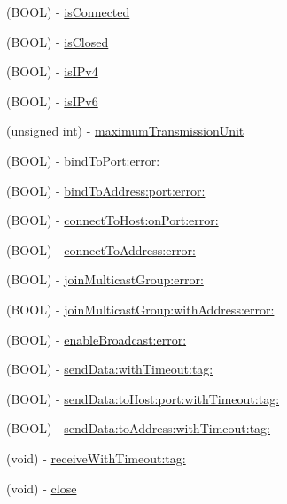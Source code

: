 \begin{DoxyCompactItemize}
\item 
(BOOL) -\/ \hyperlink{interface_async_udp_socket_ad3515f7fe2b8ed2b9e14233cf7ede0bc}{isConnected}
\item 
(BOOL) -\/ \hyperlink{interface_async_udp_socket_a96bdc12808ebe75b38f64381cedbf9df}{isClosed}
\item 
(BOOL) -\/ \hyperlink{interface_async_udp_socket_a7f1734034c9aa5b62cfeb69f203729e3}{isIPv4}
\item 
(BOOL) -\/ \hyperlink{interface_async_udp_socket_aa009ac699bce64f1d087a0eafeb2a371}{isIPv6}
\item 
(unsigned int) -\/ \hyperlink{interface_async_udp_socket_ab7dadd88df12ecfbd833b9db58c1b0a9}{maximumTransmissionUnit}
\item 
(BOOL) -\/ \hyperlink{interface_async_udp_socket_aecbce637b4fb5f214a710119d9d6a67b}{bindToPort:error:}
\item 
(BOOL) -\/ \hyperlink{interface_async_udp_socket_a706809e7b861e3f728970f0f4fc4a87d}{bindToAddress:port:error:}
\item 
(BOOL) -\/ \hyperlink{interface_async_udp_socket_a3d9205d70242e9e2547148c6b05b397e}{connectToHost:onPort:error:}
\item 
(BOOL) -\/ \hyperlink{interface_async_udp_socket_a2e1af5ef7a3e1ee37613dddb7c0e0617}{connectToAddress:error:}
\item 
(BOOL) -\/ \hyperlink{interface_async_udp_socket_a017c4048c57b08c914eb286545de5fbd}{joinMulticastGroup:error:}
\item 
(BOOL) -\/ \hyperlink{interface_async_udp_socket_ae08a6f71ba60a287697eac897b85949a}{joinMulticastGroup:withAddress:error:}
\item 
(BOOL) -\/ \hyperlink{interface_async_udp_socket_a447b30538bbdd3b3f7be8babeefde3fa}{enableBroadcast:error:}
\item 
(BOOL) -\/ \hyperlink{interface_async_udp_socket_aa4ea3b5358c65d92e0f6256f52a81954}{sendData:withTimeout:tag:}
\item 
(BOOL) -\/ \hyperlink{interface_async_udp_socket_a00f3a40612b9438d2020816c117752d7}{sendData:toHost:port:withTimeout:tag:}
\item 
(BOOL) -\/ \hyperlink{interface_async_udp_socket_a9c4be72c8ddb202c4cbf6f68bd53fd75}{sendData:toAddress:withTimeout:tag:}
\item 
(void) -\/ \hyperlink{interface_async_udp_socket_aa69663e07c9b05ec717a89760abab0cd}{receiveWithTimeout:tag:}
\item 
(void) -\/ \hyperlink{interface_async_udp_socket_a5ae591df94fc66ccb85cbb6565368bca}{close}

\end{DoxyCompactItemize}
